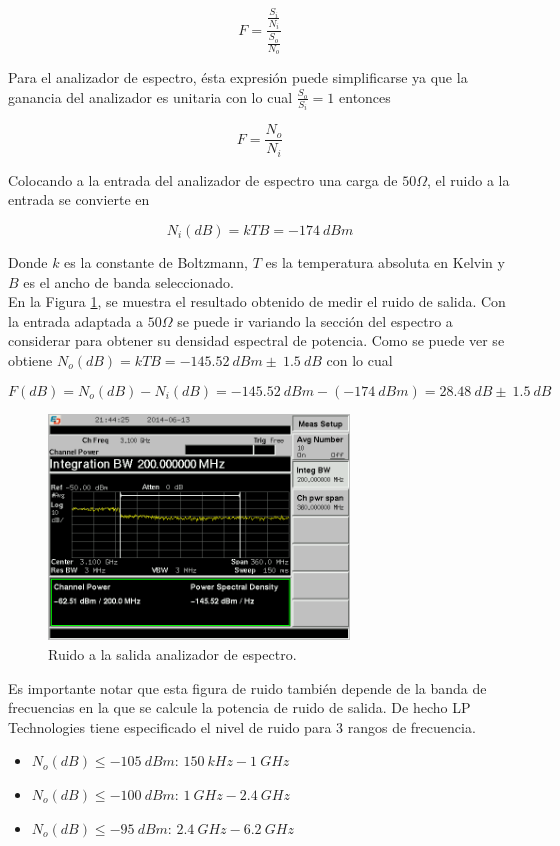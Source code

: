 \documentclass[a4paper,10pt]{article}
\begin{document}
		$$F=\frac{\frac{S_i}{N_i}}{\frac{S_o}{N_o}}$$
		
		\indent Para el analizador de espectro, \'esta expresi\'on puede 
		simplificarse ya que la ganancia del analizador es unitaria con lo cual 
		$\frac{S_o}{S_i}=1$ entonces
		
		$$F=\frac{N_o}{N_i}$$
		
		\indent Colocando a la entrada del analizador de espectro una carga de 
		$50\Omega$, el ruido a la entrada se convierte en 

		$$N_i(dB)=kTB=-174~dBm$$
		
		\indent Donde $k$ es la constante de Boltzmann, $T$ es la temperatura 
		absoluta en Kelvin y $B$ es el ancho de banda seleccionado. \\
		\indent En la Figura \ref{noise}, se muestra el resultado obtenido de 
		medir el ruido de salida. Con la entrada adaptada a $50\Omega$ se puede 
		ir variando la secci\'on del espectro a considerar para obtener su 
		densidad espectral de potencia. Como se puede ver se obtiene 
		$N_o(dB)=kTB=-145.52~dBm\pm~1.5~dB$ con lo cual
		
		$$F(dB)=N_o(dB)-N_i(dB)=-145.52~dBm-(-174~dBm)=28.48~dB\pm~1.5~dB$$
		
		\begin{figure}[!htb]
				\centering
				\includegraphics[width=8cm]
				{Imagenes/SCREN464.png}
				\caption{Ruido a la salida  analizador de espectro.}
				\label{noise} 
		\end{figure}
		
		\indent Es importante notar que esta figura de ruido tambi\'en depende 
		de la banda de frecuencias en la que se calcule la potencia de ruido de 
		salida. De hecho LP Technologies tiene especificado el nivel de ruido 
		para 3 rangos de frecuencia.
		
		\begin{itemize}
			\item $N_o(dB)\leq-105~dBm$: 	$150~kHz-1~GHz$
			\item $N_o(dB)\leq-100~dBm$:	 $1~GHz-2.4~GHz$
			\item $N_o(dB)\leq-95~dBm$:	 $2.4~GHz-6.2~GHz$
		\end{itemize}
		
\end{document}
